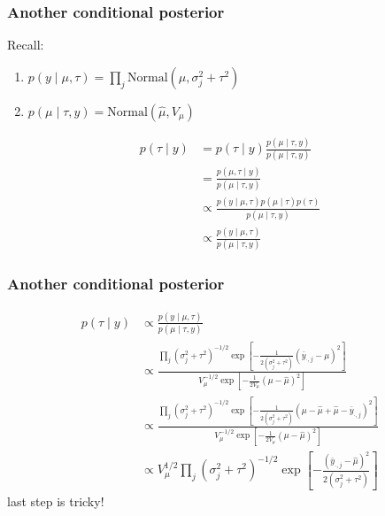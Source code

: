 \documentclass{beamer}
\begin{document}
\begin{frame}
\frametitle{Another conditional posterior }

Recall:
\begin{enumerate}
\item $p(y \mid \mu, \tau) = \prod_j \text{Normal}(\mu, \sigma^2_j + \tau^2)$
\item $p(\mu \mid \tau, y) = \text{Normal}(\hat{\mu}, V_{\mu})$
\end{enumerate}


\begin{align*}
p( \tau \mid y) &= p( \tau \mid y) \frac{p(\mu \mid \tau, y)  }{ p(\mu \mid \tau, y) } \\
&=  \frac{p(\mu, \tau\mid y)  }{ p(\mu \mid \tau, y) } \\
&\propto  \frac{ p(y \mid \mu, \tau) p(\mu \mid \tau) p(\tau) }{ p(\mu \mid \tau, y) } \\
&\propto  \frac{ p(y \mid \mu, \tau)  }{ p(\mu \mid \tau, y) } 
\end{align*}



\end{frame}


\begin{frame}
\frametitle{Another conditional posterior }


\begin{align*}
p(\tau \mid y) &\propto \frac{ p(y \mid \mu, \tau)  }{ p(\mu \mid \tau, y) } \\
&\propto \frac{\prod_j (\sigma^2_j + \tau^2)^{-1/2} \exp\left[ -\frac{1}{2 (\sigma^2_j + \tau^2) } (\bar{y}_{\cdot,j} - \mu)^2\right] }{ V_{\mu}^{-1/2} \exp\left[ -\frac{1}{2 V_{\mu} } (\mu -\hat{\mu} )^2\right] } \\
&\propto \frac{\prod_j (\sigma^2_j + \tau^2)^{-1/2} \exp\left[ -\frac{1}{2 (\sigma^2_j + \tau^2) } (\mu -  \hat{\mu} + \hat{\mu} - \bar{y}_{\cdot,j}  )^2\right] }{ V_{\mu}^{-1/2} \exp\left[ -\frac{1}{2 V_{\mu} } (\mu -\hat{\mu} )^2\right] } \\
&\propto V_{\mu}^{1/2} \prod_{j} (\sigma^2_j + \tau^2)^{-1/2} \exp\left[ -\frac{ (\bar{y}_{\cdot,j} - \hat{\mu})^2 }{2(\sigma^2_j + \tau^2)}\right]
\end{align*}
last step is tricky!


\end{frame}
\end{document}
